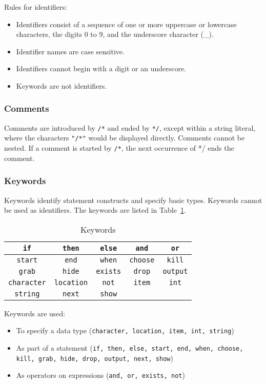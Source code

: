 \documentclass[12pt]{article}
\begin{document}
\noindent Rules for identifiers:
\begin{itemize}
\item Identifiers consist of a sequence of one or more uppercase or lowercase characters, the digits 0 to 9, and the underscore character (\_).
\item Identifier names are case sensitive.
\item Identifiers cannot begin with a digit or an underscore.
\item Keywords are not identifiers.
\end{itemize}

\subsubsection{Comments}
Comments are introduced by \texttt{/*} and ended by \texttt{*/}, except within a string literal, where the characters \texttt{"/*"} would be displayed directly.  Comments cannot be nested.  If a comment is started by \texttt{/*}, the next occurrence of */ ends the comment.

\subsubsection{Keywords}
Keywords identify statement constructs and specify basic types.  Keywords cannot be used as identifiers.  The keywords are listed in Table~\ref{keywords}.

\begin{table}[htdp]
\caption{Keywords}
\begin{center}
\begin{tabular}{|c|c|c|c|c|}
\hline
\texttt{if} & \texttt{then} & \texttt{else} & \texttt{and} & \texttt{or} \\
\hline
\texttt{start} & \texttt{end} & \texttt{when} & \texttt{choose} & \texttt{kill} \\
\hline
\texttt{grab} & \texttt{hide} & \texttt{exists} & \texttt{drop} & \texttt{output} \\
\hline
\texttt{character} & \texttt{location} & \texttt{not} & \texttt{item} & \texttt{int} \\
\hline
\texttt{string} & \texttt{next} & \texttt{show} & &  \\
\hline
\end{tabular}
\end{center}
\label{keywords}
\end{table}

\noindent Keywords are used:
\begin{itemize}
\item To specify a data type (\texttt{character, location, item, int, string})
\item As part of a statement (\texttt{if, then, else, start, end, when, choose, kill, grab, hide, drop, output, next, show}) 
\item As operators on expressions (\texttt{and, or, exists, not})
\end{itemize}
\end{document}
